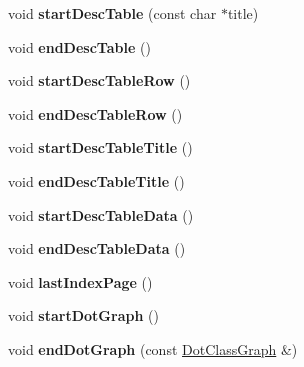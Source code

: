\begin{DoxyCompactItemize}
void {\bfseries start\+Desc\+Table} (const char $\ast$title)
\item 
\mbox{\label{class_latex_generator_a93e92fa0f35e8f3da32b0f08597a0285}} 
void {\bfseries end\+Desc\+Table} ()
\item 
\mbox{\label{class_latex_generator_af79ef99d8e2f28c069857b796e6b7390}} 
void {\bfseries start\+Desc\+Table\+Row} ()
\item 
\mbox{\label{class_latex_generator_a510d0747644edc3deeca0873ed5c3817}} 
void {\bfseries end\+Desc\+Table\+Row} ()
\item 
\mbox{\label{class_latex_generator_a229466fe4c9fa9251c0bfb514600feaf}} 
void {\bfseries start\+Desc\+Table\+Title} ()
\item 
\mbox{\label{class_latex_generator_a3481549b50ac3745a5de40a590bf1fb5}} 
void {\bfseries end\+Desc\+Table\+Title} ()
\item 
\mbox{\label{class_latex_generator_a2fca61002fe342c603e112cc4e99921f}} 
void {\bfseries start\+Desc\+Table\+Data} ()
\item 
\mbox{\label{class_latex_generator_aa3830e8ae350a66bbec769c2a9337305}} 
void {\bfseries end\+Desc\+Table\+Data} ()
\item 
\mbox{\label{class_latex_generator_a5bd03c7e1a88abb8d5445bec8581b2aa}} 
void {\bfseries last\+Index\+Page} ()
\item 
\mbox{\label{class_latex_generator_a0b8173550d071d48f622c079d6644766}} 
void {\bfseries start\+Dot\+Graph} ()
\item 
\mbox{\label{class_latex_generator_a32fb1304b77bc952caeaa77da648fd2d}} 
void {\bfseries end\+Dot\+Graph} (const \mbox{\hyperlink{class_dot_class_graph}{Dot\+Class\+Graph}} \&)
\item 
\mbox{\label{class_latex_generator_ae34e761905a08ff5ec95bcd9668729a3}} 

\end{DoxyCompactItemize}
